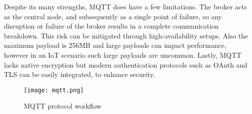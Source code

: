 Despite its many strengths, MQTT does have a few limitations. The broker acts as the central node, and subsequently as a single point of failure, so any disruption or failure of the broker results in a complete communication breakdown. This risk can be mitigated through high-availability setups. Also the maximum payload is 256MB and large payloads can impact performance, however in an IoT scenario such large payloads are uncommon. Lastly, MQTT lacks native encryption but modern authentication protocols such as OAuth and TLS can be easily integrated, to enhance security\cite{mqtt}.

\begin{figure}[!h]
    \graphicspath{ {./diagrams/} }
    \texttt{[image: mqtt.png]}
    \centering
    \caption{MQTT protocol workflow}
    \label{fig:mqtt}
\end{figure}